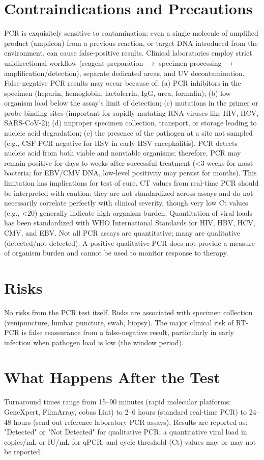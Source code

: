 \section*{Contraindications and Precautions}
PCR is exquisitely sensitive to contamination: even a single molecule of amplified product (amplicon) from a previous reaction, or target DNA introduced from the environment, can cause false-positive results. Clinical laboratories employ strict unidirectional workflow (reagent preparation $\rightarrow$ specimen processing $\rightarrow$ amplification/detection), separate dedicated areas, and UV decontamination. False-negative PCR results may occur because of: (a) PCR inhibitors in the specimen (heparin, hemoglobin, lactoferrin, IgG, urea, formalin); (b) low organism load below the assay's limit of detection; (c) mutations in the primer or probe binding sites (important for rapidly mutating RNA viruses like HIV, HCV, SARS-CoV-2); (d) improper specimen collection, transport, or storage leading to nucleic acid degradation; (e) the presence of the pathogen at a site not sampled (e.g., CSF PCR negative for HSV in early HSV encephalitis). PCR detects nucleic acid from both viable and nonviable organisms; therefore, PCR may remain positive for days to weeks after successful treatment (<3 weeks for most bacteria; for EBV/CMV DNA, low-level positivity may persist for months). This limitation has implications for test of cure. CT values from real-time PCR should be interpreted with caution: they are not standardized across assays and do not necessarily correlate perfectly with clinical severity, though very low Ct values (e.g., <20) generally indicate high organism burden. Quantitation of viral loads has been standardized with WHO International Standards for HIV, HBV, HCV, CMV, and EBV. Not all PCR assays are quantitative; many are qualitative (detected/not detected). A positive qualitative PCR does not provide a measure of organism burden and cannot be used to monitor response to therapy.

\section*{Risks}
No risks from the PCR test itself. Risks are associated with specimen collection (venipuncture, lumbar puncture, swab, biopsy). The major clinical risk of RT-PCR is false reassurance from a false-negative result, particularly in early infection when pathogen load is low (the window period).

\section*{What Happens After the Test}
Turnaround times range from 15--90 minutes (rapid molecular platforms: GeneXpert, FilmArray, cobas Liat) to 2--6 hours (standard real-time PCR) to 24--48 hours (send-out reference laboratory PCR assays). Results are reported as: "Detected" or "Not Detected" for qualitative PCR; a quantitative viral load in copies/mL or IU/mL for qPCR; and cycle threshold (Ct) values may or may not be reported.

